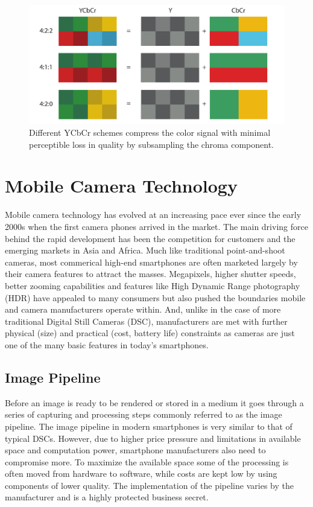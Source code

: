 \documentclass[thesis.tex]{subfiles}
\begin{document}
\begin{figure}[h]
\centering \includegraphics[width=\textwidth]{images/ycbcr}
\caption{Different YCbCr schemes compress the color signal with minimal perceptible loss in quality by subsampling the chroma component.\label{figure:ycbcr}}
\end{figure}

\section{Mobile Camera Technology}
\label{section:mobile_camera_technology}
Mobile camera technology has evolved at an increasing pace ever since the early 2000s when the first camera phones arrived in the market. The main driving force behind the rapid development has been the competition for customers and the emerging markets in Asia and Africa. Much like traditional point-and-shoot cameras, most commerical high-end smartphones are often marketed largely by their camera features to attract the masses. Megapixels, higher shutter speeds, better zooming capabilities and features like High Dynamic Range photography (HDR) have appealed to many consumers but also pushed the boundaries mobile and camera manufacturers operate within. And, unlike in the case of more traditional Digital Still Cameras (DSC), manufacturers are met with further physical (size) and practical (cost, battery life) constraints as cameras are just one of the many basic features in today's smartphones.

\subsection{Image Pipeline}
Before an image is ready to be rendered or stored in a medium it goes through a series of capturing and processing steps commonly referred to as the image pipeline. The image pipeline in modern smartphones is very similar to that of typical DSCs. However, due to higher price pressure and limitations in available space and computation power, smartphone manufacturers also need to compromise more. To maximize the available space some of the processing is often moved from hardware to software, while costs are kept low by using components of lower quality. The implementation of the pipeline varies by the manufacturer and is a highly protected business secret.
\end{document}
